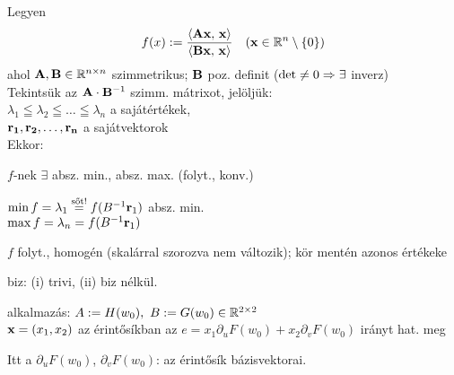 \begin{te}
  Legyen
  \[ f(x) := \dfrac{\langle\mathbf{A}\mathbf{x},\,\mathbf{x}\rangle}{\langle\mathbf{B}\mathbf{x},\,\mathbf{x}\rangle} \quad (\mathbf{x}\in\mathbb{R}^n\setminus
  \{0\}) \]
  ahol $\mathbf{A},\mathbf{B}\in\mathbb{R}^{n\times n}$ szimmetrikus; $\mathbf{B}$ poz. definit ($\det \neq 0 \Rightarrow \exists$ inverz)\\
  Tekintsük az $\mathbf{A}\cdot\mathbf{B}^{-1}$ szimm. mátrixot, jelöljük:\\
  $\lambda_1 \leqq \lambda_2 \leqq\ldots \leqq   \lambda_n$ a sajátértékek,\\
  $\mathbf{r_1},\mathbf{r_2},\dotsc, \mathbf{r_n}$ a sajátvektorok\\
  Ekkor:
  \begin{enumzjr}
  \item $f$-nek $\exists$ absz. min., absz. max. (folyt., konv.)
  \item $\min f = \lambda_1 \overset{\text{sőt!}}{=} f(B^{-1}\mathbf{r}_1)$ absz. min.\\
    $\max f = \lambda_n =  f(B^{-1}\mathbf{r}_1)$    
\end{enumzjr}
\end{te}

\begin{Megj}
\item $f$ folyt., homogén (skalárral szorozva nem változik); kör mentén azonos értékeke
\item biz: (i) trivi, (ii) biz nélkül.
\item alkalmazás: $A := H(w_0),\ B:=G(w_0)\in\R^{2\times2}$\\
  $\mathbf{x}=(x_1,x_2)$ az érintősíkban az $e = x_1\partial_uF(w_0) + x_2 \partial_vF(w_0)$ irányt hat. meg

  Itt a $\partial_uF(w_0)$, $\partial_vF(w_0)$: az érintősík bázisvektorai.
\end{Megj}


